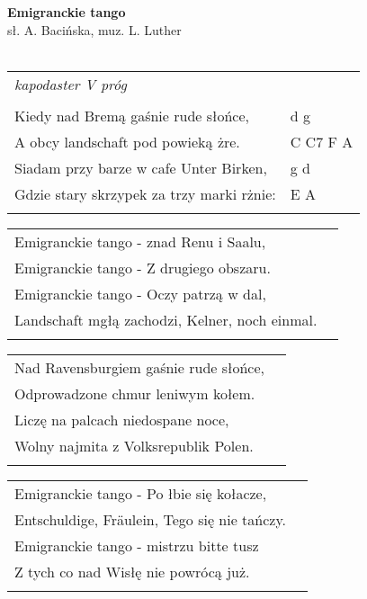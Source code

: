 \documentclass[a5paper]{article}
\begin{document}


\noindent
\fontsize{12pt}{15pt}\selectfont
\textbf{Emigranckie tango} \\
\fontsize{8pt}{10pt}\selectfont
sł. A. Bacińska, muz. L. Luther \\ \\
\fontsize{10pt}{12pt}\selectfont
{}
\begin{tabular}{@{}p{8.5cm}p{3cm}@{}}
\noindent
\emph{kapodaster V próg} \\ \\

Kiedy nad Bremą gaśnie rude słońce, & d g \\
A obcy landschaft pod powieką żre. & C C7 F A \\
Siadam przy barze w cafe  Unter Birken, & g d \\
Gdzie stary skrzypek za trzy marki rżnie: & E A \\ \\
\end{tabular}

\noindent
\begin{tabular}{@{}p{8.5cm}p{3cm}@{}}
	Emigranckie tango - znad Renu i Saalu, \\
	Emigranckie tango - Z drugiego obszaru.\\
	Emigranckie tango - Oczy patrzą w dal,\\
	Landschaft mgłą zachodzi, Kelner, noch einmal.\\\\
\end{tabular}

\noindent
\begin{tabular}{@{}p{8.5cm}p{3cm}@{}}
Nad Ravensburgiem gaśnie rude słońce,\\
Odprowadzone chmur leniwym kołem.\\
Liczę na palcach niedospane noce,\\
Wolny najmita z Volksrepublik Polen.\\\\
\end{tabular}

\noindent
\begin{tabular}{@{}p{8.5cm}p{3cm}@{}}
	Emigranckie tango - Po łbie się kołacze,\\
	Entschuldige, Fräulein, Tego się nie tańczy.\\
	Emigranckie tango - mistrzu bitte tusz\\
	Z tych co nad Wisłę nie powrócą już.\\\\
\end{tabular}
\end{document}
